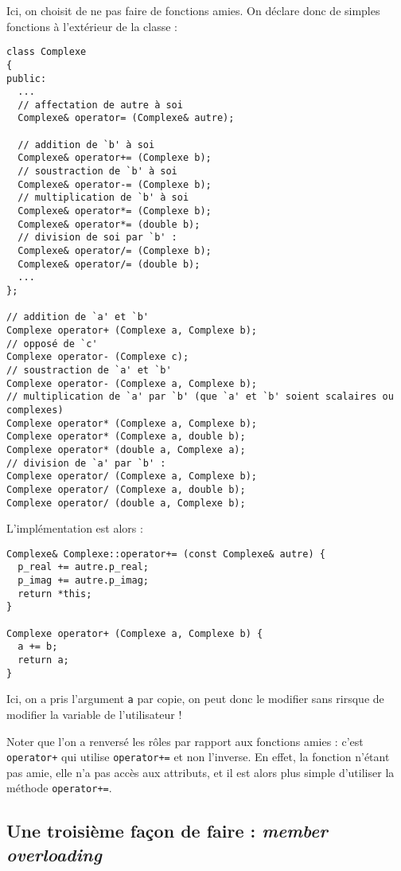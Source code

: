 \documentclass{book}
\newcommand{\inline}[1]{\texttt{#1}}
\begin{document}
\begin{correction}
Ici, on choisit de ne pas faire de fonctions amies. On déclare donc de simples fonctions à l'extérieur de la classe :

\begin{verbatim}
class Complexe
{
public:
  ...
  // affectation de autre à soi
  Complexe& operator= (Complexe& autre);
  
  // addition de `b' à soi
  Complexe& operator+= (Complexe b);
  // soustraction de `b' à soi
  Complexe& operator-= (Complexe b);
  // multiplication de `b' à soi
  Complexe& operator*= (Complexe b);
  Complexe& operator*= (double b);
  // division de soi par `b' :
  Complexe& operator/= (Complexe b);
  Complexe& operator/= (double b);
  ...
};

// addition de `a' et `b'
Complexe operator+ (Complexe a, Complexe b);
// opposé de `c'
Complexe operator- (Complexe c);
// soustraction de `a' et `b'
Complexe operator- (Complexe a, Complexe b);
// multiplication de `a' par `b' (que `a' et `b' soient scalaires ou complexes)
Complexe operator* (Complexe a, Complexe b);
Complexe operator* (Complexe a, double b);
Complexe operator* (double a, Complexe a);
// division de `a' par `b' :
Complexe operator/ (Complexe a, Complexe b);
Complexe operator/ (Complexe a, double b);
Complexe operator/ (double a, Complexe b);
\end{verbatim}

L'implémentation est alors :

\begin{verbatim}
Complexe& Complexe::operator+= (const Complexe& autre) {
  p_real += autre.p_real;
  p_imag += autre.p_imag;
  return *this;
}

Complexe operator+ (Complexe a, Complexe b) {
  a += b;
  return a;
}
\end{verbatim}
Ici, on a pris l'argument \inline{a} par copie, on peut donc le modifier sans rirsque de modifier la variable de l'utilisateur !

Noter que l'on a renversé les rôles par rapport aux fonctions amies : c'est \inline{operator+} qui utilise \inline{operator+=} et non l'inverse. En effet, la fonction n'étant pas amie, elle n'a pas accès aux attributs, et il est alors plus simple d'utiliser la méthode \inline{operator+=}.

\subsection*{Une troisième façon de faire : \textit{member overloading}}


\end{correction}
\end{document}
